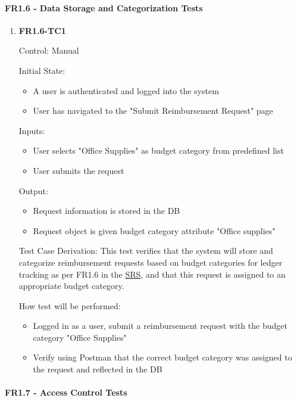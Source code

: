 \documentclass[12pt, titlepage]{article}
\begin{document}
\paragraph{FR1.6 - Data Storage and Categorization Tests}

\begin{enumerate}
    \item{\textbf{FR1.6-TC1}}
    \hypertarget{FR1.6-TC1}{}
    
    Control: Manual
    
    Initial State:
    \begin{itemize}
        \item A user is authenticated and logged into the system
        \item User has navigated to the "Submit Reimbursement Request" page
    \end{itemize}
    
    Inputs: 
    \begin{itemize}
        \item User selects "Office Supplies" as budget category from predefined list
        \item User submits the request
    \end{itemize}
    
    Output: 
    \begin{itemize}
        \item Request information is stored in the DB
        \item Request object is given budget category attribute "Office supplies"
    \end{itemize}
    
    Test Case Derivation: This test verifies that the system will store and categorize reimbursement requests based on budget categories for ledger tracking as per FR1.6 in the \href{https://shorturl.at/FdAgR}{SRS}, and that this request is assigned to an appropriate budget category.
    
    How test will be performed:
    \begin{itemize}
        \item Logged in as a user, submit a reimbursement request with the budget category "Office Supplies"
        \item Verify using Postman that the correct budget category was assigned to the request and reflected in the DB
    \end{itemize}
\end{enumerate}

\paragraph{FR1.7 - Access Control Tests}
\end{document}
